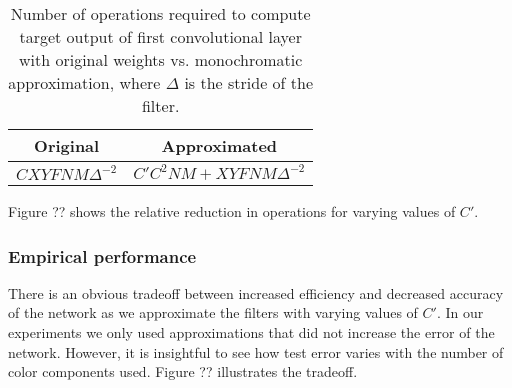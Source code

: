\begin{table}[h]
\tiny
\parbox{\linewidth}{
\centering
\begin{tabular}{cc}
\hline
Original & Approximated \\
\hline
$C X Y F N M \Delta^{-2}$  & $	 C' C^2 N M + X Y F N M \Delta^{-2}$\\
\hline
\end{tabular}
\caption{Number of operations required to compute target output of first convolutional layer with original weights vs. monochromatic approximation, where $\Delta$ is the stride of the filter.}
\label{monochromatic_ops}
}
\end{table}

Figure ?? shows the relative reduction in operations for varying values of $C'$.

\subsubsection{Empirical performance}
There is an obvious tradeoff between increased efficiency and decreased accuracy of the network as we approximate the filters with varying values of $C'$. In our experiments we only used approximations that did not increase the error of the network. However, it is insightful to see how test error varies with the number of color components used. Figure ?? illustrates the tradeoff.

